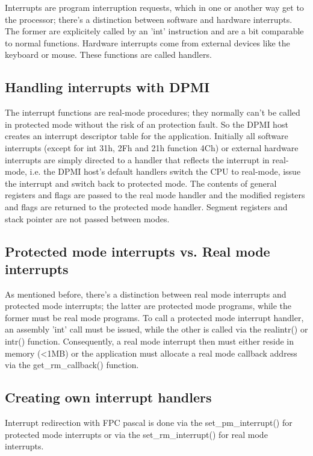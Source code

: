 Interrupts are program interruption requests, which in one or another way
get to the processor; there's a distinction between software and hardware
interrupts. The former are explicitely called by an 'int' instruction and
are a bit comparable to normal functions. Hardware interrupts come from
external devices like the keyboard or mouse. These functions are called
handlers.

\subsection{Handling interrupts with DPMI}

The interrupt functions are real-mode procedures; they normally can't be
called in protected mode without the risk of an protection fault. So the
DPMI host creates an interrupt descriptor table for the application.
Initially all software interrupts (except for int 31h, 2Fh and 21h function
4Ch) or external hardware interrupts are simply directed to a handler that
reflects the interrupt in real-mode, i.e. the DPMI host's default handlers
switch the CPU to real-mode, issue the interrupt and switch back to
protected mode. The contents of general registers and flags are passed to
the real mode handler and the modified registers and flags are returned to
the protected mode handler. Segment registers and stack pointer are not
passed between modes.

\subsection{Protected mode interrupts vs. Real mode interrupts}

As mentioned before, there's a distinction between real mode interrupts and
protected mode interrupts; the latter are protected mode programs, while the
former must be real mode programs. To call a protected mode interrupt
handler, an assembly 'int' call must be issued, while the other is called
via the realintr() or intr() function. Consequently, a real mode interrupt
then must either reside in \dos memory (<1MB) or the application must
allocate a real mode callback address via the get\_rm\_callback() function.

\subsection{Creating own interrupt handlers}

Interrupt redirection with FPC pascal is done via the set\_pm\_interrupt() for
protected mode interrupts or via the set\_rm\_interrupt() for real mode
interrupts.

